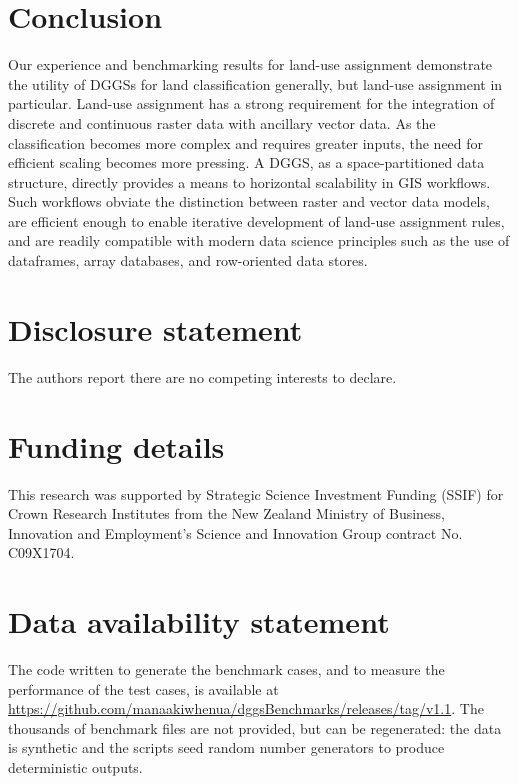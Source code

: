 \documentclass[]{interact}
\theoremstyle{plain}%
\theoremstyle{definition}
\theoremstyle{remark}
\begin{document}
\section{Conclusion}

Our experience and benchmarking results for land-use assignment demonstrate the utility of \acp{DGGS} for land classification generally, but land-use assignment in particular. Land-use assignment has a strong requirement for the integration of discrete and continuous raster data with ancillary vector data. As the classification becomes more complex and requires greater inputs, the need for efficient scaling becomes more pressing. A \ac{DGGS}, as a space-partitioned data structure, directly provides a means to horizontal scalability in \ac{GIS} workflows. Such workflows obviate the distinction between raster and vector data models, are efficient enough to enable iterative development of land-use assignment rules, and are readily compatible with modern data science principles such as the use of dataframes, array databases, and row-oriented data stores.

\clearpage

\section*{Disclosure statement}

The authors report there are no competing interests to declare.

\section*{Funding details}

This research was supported by Strategic Science Investment Funding (SSIF) for Crown Research Institutes from the New Zealand Ministry of Business, Innovation and Employment's Science and Innovation Group contract No. C09X1704.

\section*{Data availability statement}
The code written to generate the benchmark cases, and to measure the performance of the test cases, is available at \url{https://github.com/manaakiwhenua/dggsBenchmarks/releases/tag/v1.1}. The thousands of benchmark files are not provided, but can be regenerated: the data is synthetic and the scripts seed random number generators to produce deterministic outputs.
\end{document}
